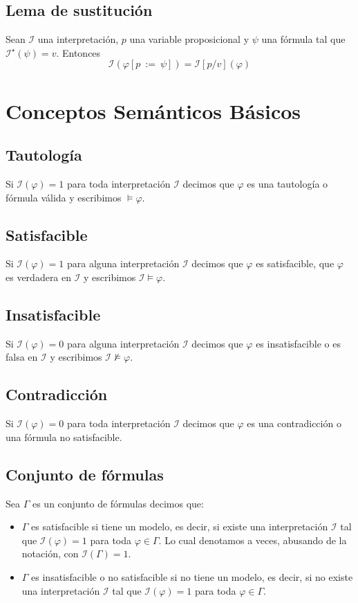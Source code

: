 \documentclass[a4paper]{article}
\begin{document}
\subsection{Lema de sustitución}
Sean $\mathcal{I}$ una interpretación, $p$ una variable 
proposicional y $\psi$ una fórmula tal que $\mathcal{I}^{\star}(\psi) = v$. Entonces
\[
    \mathcal{I}\left(\varphi\left[p \ := \ \psi\right]\right) = \mathcal{I}\left[p / v\right]\left(\varphi\right)
\]
\section{Conceptos Semánticos Básicos}
\subsection{Tautología}
Si $\mathcal{I}(\varphi)=1$ para toda interpretación $\mathcal{I}$ decimos que 
$\varphi$ es una tautología o fórmula válida y escribimos $\models\varphi$.
\subsection{Satisfacible}
Si $\mathcal{I}(\varphi)=1$ para alguna interpretación $\mathcal{I}$ decimos que 
$\varphi$ es satisfacible,  que \(\varphi\) es verdadera en \(\mathcal{I}\) y 
escribimos $ \mathcal{I} \models\varphi$.
\subsection{Insatisfacible}
Si $\mathcal{I}(\varphi)=0$ para alguna interpretación $\mathcal{I}$ decimos que 
$\varphi$ es insatisfacible o es falsa en \(\mathcal{I}\) y 
escribimos $ \mathcal{I} \nvDash\varphi$.
\subsection{Contradicción}
Si $\mathcal{I}(\varphi)=0$ para toda interpretación $\mathcal{I}$ decimos que 
$\varphi$ es una contradicción o una fórmula no satisfacible.
\subsection{Conjunto de fórmulas}
Sea $\Gamma$ es un conjunto de fórmulas decimos que:
\begin{itemize}
    \item $\Gamma$ es satisfacible si tiene un modelo, es decir, si existe una 
    interpretación $\mathcal{I}$ tal que $\mathcal{I}(\varphi)=1$ para toda 
    $\varphi\in\Gamma$. Lo cual denotamos a veces, abusando de la notación, 
    con $\mathcal{I}(\Gamma)=1$.
    \item $\Gamma$ es insatisfacible o no satisfacible si no tiene un
    modelo, es decir, si no existe una interpretación $\mathcal{I}$ tal que 
    $\mathcal{I}(\varphi)=1$ para toda $\varphi\in\Gamma$.
\end{itemize}
\end{document}
